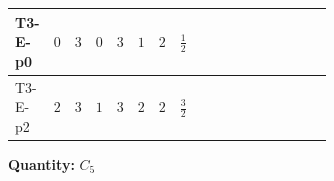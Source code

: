 \documentclass[8pt]{article}
\begin{document}
\begin{landscape}
\begin{longtable}{@{}llcccccc >{\raggedright\arraybackslash}p{0.21\linewidth} >{\raggedright\arraybackslash}p{0.21\linewidth} >{\raggedright\arraybackslash}p{0.21\linewidth}@{}}
\midrule
T3-E-p0 & $0$ & $3$ & $0$ & $3$ & $1$ & $2$ & $\frac{1}{2}$ & \scriptsize\adjustbox{max width=\linewidth}{$\begin{gathered} - 3 C_{5} g_{2}^{2}\end{gathered}$} & \scriptsize\adjustbox{max width=\linewidth}{$\begin{gathered} 2 C_{5} \lambda_1\end{gathered}$} & \scriptsize\adjustbox{max width=\linewidth}{$\begin{gathered} - C_{5} Y_e Y_e^\dagger\end{gathered}$} \\
\midrule
T3-E-p2 & $2$ & $3$ & $1$ & $3$ & $2$ & $2$ & $\frac{3}{2}$ & \scriptsize\adjustbox{max width=\linewidth}{$\begin{gathered} - 3 C_{5} g_{2}^{2}\end{gathered}$} & \scriptsize\adjustbox{max width=\linewidth}{$\begin{gathered} 2 C_{5} \lambda_1\end{gathered}$} & \scriptsize\adjustbox{max width=\linewidth}{$\begin{gathered} - C_{5} Y_e Y_e^\dagger\end{gathered}$} \\
\midrule
\bottomrule
\end{longtable}
\clearpage
\noindent\textbf{Quantity: }$C_5$\par\smallskip

\end{landscape}
\end{document}
